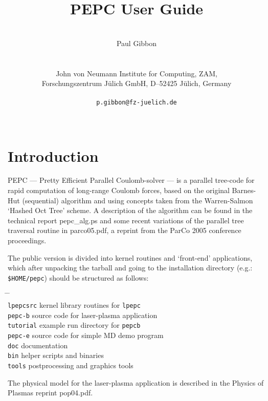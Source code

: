 \documentclass[11pt,psfig]{article}
\title{PEPC User Guide\\}
\author{\\ Paul Gibbon \\ \\ \\
John von Neumann Institute for Computing, ZAM,\\
Forschungszentrum J\"ulich GmbH, D--52425 J\"ulich, Germany\\ \\  {\tt p.gibbon@fz-juelich.de} \\\\
}
\begin{document}
\maketitle
\pagebreak

\begin{tableofcontents}
\end{tableofcontents}

\pagebreak

\section{Introduction}
\normalsize
PEPC --- Pretty Efficient Parallel Coulomb-solver --- is a parallel tree-code 
for rapid computation of long-range Coulomb forces, based on the original
Barnes-Hut (sequential) algorithm and using concepts taken from the
Warren-Salmon `Hashed Oct Tree' scheme.  A description of the algorithm can be
found in the technical report pepc\_alg.ps and some recent variations of the parallel tree
traversal routine in parco05.pdf, a reprint from the ParCo 2005 conference proceedings.

\medskip\noindent
The public version is divided into kernel routines and `front-end'
applications, which after unpacking the tarball and going to the installation
directory (e.g.: {\tt \$HOME/pepc}) should be structured as follows:
\begin{tabbing}
\hspace{1cm} \= \hspace{4cm} \= \hspace{1cm} \\
\> \texttt{lpepcsrc} \> kernel library routines for {\tt lpepc}\\
\> \texttt{pepc-b} \> source code for laser-plasma application \\
\> \texttt{tutorial} \> example run directory for {\tt pepcb}\\
\> \texttt{pepc-e} \> source code for simple MD demo program \\
\> \texttt{doc} \> documentation\\
\> \texttt{bin} \> helper scripts and binaries\\
\> \texttt{tools} \> postprocessing and graphics tools
\end{tabbing}

\noindent 
The physical model for the laser-plasma application is described in the Physics of Plasmas reprint pop04.pdf.
\end{document}
